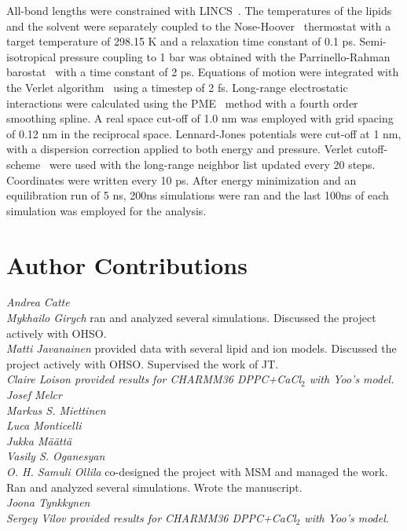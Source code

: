 \documentclass[pre,aps,floatfix,authordate1-4,twocolumn]{revtex4-1}
\begin{document}
All-bond lengths were constrained with LINCS~\cite{hess97,hess07}. The temperatures of the lipids and the solvent were separately coupled to the Nose-Hoover~\cite{nose84,hoover85} 
thermostat with a target temperature of 298.15 K and a relaxation time constant of 0.1 ps. Semi-isotropical pressure coupling to 1 bar was obtained 
with the Parrinello-Rahman barostat~\cite{parrinello81} with a time constant of 2 ps. Equations of motion were integrated with the Verlet algorithm~\cite{pall13} using a 
timestep of 2 fs. Long-range electrostatic interactions were calculated using the PME~\cite{darden93,essman95} method with a fourth order smoothing spline. 
A real space cut-off of 1.0 nm was employed with grid spacing of 0.12 nm in the reciprocal space. Lennard-Jones potentials were cut-off at 1 nm, 
with a dispersion correction applied to both energy and pressure. Verlet cutoff-scheme~\cite{pall13} were used with the long-range neighbor list updated 
every 20 steps. Coordinates were written every 10 ps. After energy minimization and an equilibration run of 5 ns, 200ns simulations were ran and 
the last 100ns of each simulation was employed for the analysis.



\section{Author Contributions}
\noindent 
{\it Andrea Catte} \\
{\it Mykhailo Girych} ran and analyzed several simulations. Discussed the project actively with OHSO. \\
{\it Matti Javanainen} provided data with several lipid and ion models. Discussed the project actively with OHSO. Supervised the work of JT.\\
{\it Claire Loison provided results for CHARMM36 DPPC+CaCl$_{2}$ with Yoo's model.} \\
{\it Josef Melcr} \\
{\it Markus S. Miettinen} \\
{\it Luca Monticelli}  \\
{\it Jukka M{\"a}{\"a}tt{\"a}}  \\
{\it Vasily S. Oganesyan} \\
{\it O. H. Samuli Ollila} co-designed the project with MSM and managed the work. Ran and analyzed several simulations. Wrote the manuscript. \\
{\it Joona Tynkkynen } \\
{\it Sergey Vilov provided results for CHARMM36 DPPC+CaCl$_{2}$ with Yoo's model.} \\

\listoftodos



\end{document}
